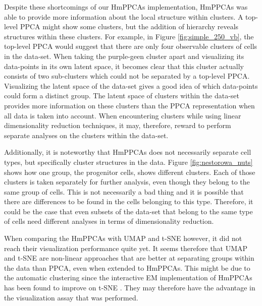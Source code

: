 Despite these shortcomings of our HmPPCAs implementation, HmPPCAs was able to provide more information about the local structure within clusters. A top-level PPCA might show some clusters, but the addition of hierarchy reveals structures within these clusters. For example, in Figure \ref{fig:simple_250_vb}, the top-level PPCA would suggest that there are only four observable clusters of cells in the data-set. When taking the purple-geen cluster apart and visualizing its data-points in its own latent space, it becomes clear that this cluster actually consists of two sub-clusters which could not be separated by a top-level PPCA. Visualizing the latent space of the data-set gives a good idea of which data-points could form a distinct group. The latent space of clusters within the data-set provides more information on these clusters than the PPCA representation when all data is taken into account. When encountering clusters while using linear dimensionality reduction techniques, it may, therefore, reward to perform separate analyses on the clusters within the data-set.

Additionally, it is noteworthy that HmPPCAs does not necessarily separate cell types, but specifically cluster structures in the data. Figure \ref{fig:nestorowa_nuts} shows how one group, the progenitor cells, shows different clusters. Each of those clusters is taken separately for further analysis, even though they belong to the same group of cells. This is not necessarily a bad thing and it is possible that there are differences to be found in the cells belonging to this type. Therefore, it could be the case that even subsets of the data-set that belong to the same type of cells need different analyses in terms of dimensionality reduction.

When comparing the HmPPCAs with UMAP and t-SNE however, it did not reach their visualization performance quite yet. It seems therefore that UMAP and t-SNE are non-linear approaches that are better at separating groups within the data than PPCA, even when extended to HmPPCAs. This might be due to the automatic clustering since the interactive EM implementation of HmPPCAs has been found to improve on t-SNE \cite{philipsthesis}. They may therefore have the advantage in the visualization assay that was performed.



